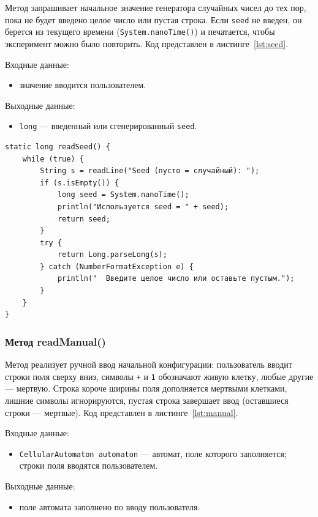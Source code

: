 Метод запрашивает начальное значение генератора случайных чисел до тех пор, пока не будет введено целое число или пустая строка. Если \texttt{seed} не введен, он берется из текущего времени (\texttt{System.nanoTime()}) и печатается, чтобы эксперимент можно было повторить. Код представлен в листинге~\ref{lst:seed}.

Входные данные:
\begin{itemize}
	\item значение вводится пользователем.
\end{itemize}

Выходные данные:
\begin{itemize}
	\item \texttt{long} --- введенный или сгенерированный \texttt{seed}.
\end{itemize}

\begin{lstlisting}[caption={Метод readSeed()}, label={lst:seed}]
static long readSeed() {
	while (true) {
		String s = readLine("Seed (пусто = случайный): ");
		if (s.isEmpty()) {
			long seed = System.nanoTime();
			println("Используется seed = " + seed);
			return seed;
		}
		try {
			return Long.parseLong(s);
		} catch (NumberFormatException e) {
			println("  Введите целое число или оставьте пустым.");
		}
	}
}
\end{lstlisting}

\subsubsection*{Метод readManual()}

Метод реализует ручной ввод начальной конфигурации: пользователь вводит строки поля сверху вниз, символы \texttt{+} и \texttt{1} обозначают живую клетку, любые другие --- мертвую. Строка короче ширины поля дополняется мертвыми клетками, лишние символы игнорируются, пустая строка завершает ввод (оставшиеся строки --- мертвые). Код представлен в листинге~\ref{lst:manual}.

Входные данные:
\begin{itemize}
	\item \texttt{CellularAutomaton automaton} --- автомат, поле которого заполняется; строки поля вводятся пользователем.
\end{itemize}

Выходные данные:
\begin{itemize}
	\item поле автомата заполнено по вводу пользователя.
\end{itemize}

